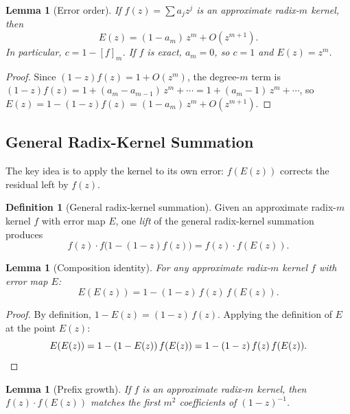 \documentclass[
  journal=largetwo,
  manuscript=article,
  manuscriptlabel={Research Preprint},
  logo=false,
  simfonts=false,
  year=2026,
  volume=1,
]{cup-journal}
\newtheorem{lemma}[theorem]{Lemma}
\theoremstyle{definition}
\newtheorem{definition}[theorem]{Definition}
\theoremstyle{remark}
\begin{document}
\begin{lemma}[Error order]
  \label{lem:errororder}
  If $f(z) = \sum a_j z^j$ is an approximate radix-$m$ kernel, then
  \[
    E(z) = (1 - a_m)\,z^m + O(z^{m+1}).
  \]
  In particular, $c = 1 - [f]_m$.
  If $f$ is exact, $a_m = 0$, so $c = 1$ and $E(z) = z^m$.
\end{lemma}

\begin{proof}
  Since $(1-z)f(z) = 1 + O(z^m)$, the degree-$m$ term is
  $(1-z)f(z) = 1 + (a_m - a_{m-1})\,z^m + \cdots = 1 + (a_m - 1)\,z^m + \cdots$,
  so $E(z) = 1 - (1-z)f(z) = (1 - a_m)\,z^m + O(z^{m+1})$.
\end{proof}

\subsection{General Radix-Kernel Summation}

The key idea is to apply the kernel to its own error: $f(E(z))$
corrects the residual left by $f(z)$.

\begin{definition}[General radix-kernel summation]
  \label{def:radixsum}
  Given an approximate radix-$m$ kernel $f$ with error map $E$,
  one \emph{lift} of the general radix-kernel summation produces
  \begin{equation}
    \label{eq:radixsum}
    f(z) \cdot f\bigl(1 - (1-z)f(z)\bigr) = f(z) \cdot f(E(z)).
  \end{equation}
\end{definition}

\begin{lemma}[Composition identity]
  \label{lem:composition}
  For any approximate radix-$m$ kernel $f$ with error map $E$:
  \begin{equation}
    \label{eq:composition}
    E(E(z)) = 1 - (1-z)\,f(z)\,f(E(z)).
  \end{equation}
\end{lemma}

\begin{proof}
  By definition, $1 - E(z) = (1-z)\,f(z)$. Applying the definition
  of $E$ at the point $E(z)$:
  \[
    E(E(z)) = 1 - (1-E(z))\,f(E(z)) = 1 - (1-z)\,f(z)\,f(E(z)).
    \qedhere
  \]
\end{proof}

\begin{lemma}[Prefix growth]
  \label{lem:prefixgrowth}
  If $f$ is an approximate radix-$m$ kernel, then
  $f(z) \cdot f(E(z))$ matches the first $m^2$ coefficients of
  $(1-z)^{-1}$.
\end{lemma}
\end{document}
